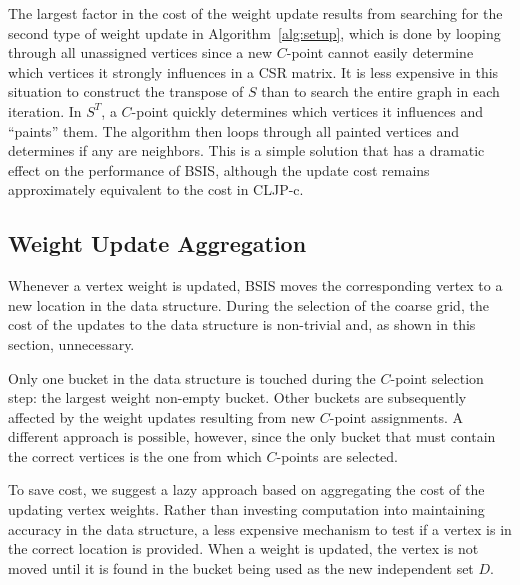 \documentclass{elsart}
\begin{document}
The largest factor in the cost of the weight update results from
searching for the second type of weight update in
Algorithm~\ref{alg:setup}, which is done by looping through all
unassigned vertices since a new $C$-point cannot easily determine
which vertices it strongly influences in a CSR matrix. It is less
expensive in this situation to construct the transpose of $S$ than to
search the entire graph in each iteration. In $S^T$, a $C$-point
quickly determines which vertices it influences and ``paints''
them. The algorithm then loops through all painted vertices and
determines if any are neighbors. This is a simple solution that has a
dramatic effect on the performance of BSIS, although the update cost
remains approximately equivalent to the cost in
CLJP-c.

\subsection{Weight Update Aggregation}
\label{5:sec:agg}
Whenever a vertex weight is updated, BSIS moves the corresponding
vertex to a new location in the data structure. During the selection
of the coarse grid, the cost of the updates to the data structure is
non-trivial and, as shown in this section, unnecessary.

Only one bucket in the data structure is touched during the $C$-point
selection step: the largest weight non-empty bucket. Other buckets are
subsequently affected by the weight updates resulting from new
$C$-point assignments. A different approach is possible, however,
since the only bucket that must contain the correct vertices is the
one from which $C$-points are selected.

To save cost, we suggest a lazy approach based on aggregating the cost
of the updating vertex weights. Rather than investing computation into
maintaining accuracy in the data structure, a less expensive mechanism
to test if a vertex is in the correct location is provided. When a
weight is updated, the vertex is not moved until it is found in the
bucket being used as the new independent set $D$.
\end{document}
